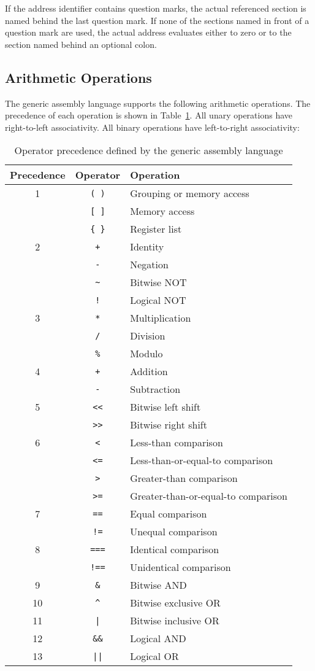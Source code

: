 If the address identifier contains question marks, the actual referenced section is named behind the last question mark.
If none of the sections named in front of a question mark are used, the actual address evaluates either to zero or to the section named behind an optional colon.

\subsection{Arithmetic Operations}

The generic assembly language supports the following arithmetic operations.
The precedence of each operation is shown in Table~\ref{tab:asmoperatorprecedence}.
All unary operations have right-to-left associativity.
All binary operations have left-to-right associativity:

\newcommand{\asmoperatorref}[2]{& \texttt{#1} & #2 \\}

\begin{table}
\centering
\begin{tabular}{@{}ccl@{}}
\toprule Precedence & Operator & Operation \\
\midrule 1
\asmoperatorref{( )}{Grouping or memory access}
\asmoperatorref{[ ]}{Memory access}
\asmoperatorref{\{ \}}{Register list}
\midrule 2
\asmoperatorref{+}{Identity}
\asmoperatorref{-}{Negation}
\asmoperatorref{\textasciitilde}{Bitwise NOT}
\asmoperatorref{!}{Logical NOT}
\midrule 3
\asmoperatorref{*}{Multiplication}
\asmoperatorref{/}{Division}
\asmoperatorref{\%}{Modulo}
\midrule 4
\asmoperatorref{+}{Addition}
\asmoperatorref{-}{Subtraction}
\midrule 5
\asmoperatorref{<{}<}{Bitwise left shift}
\asmoperatorref{>{}>}{Bitwise right shift}
\midrule 6
\asmoperatorref{<}{Less-than comparison}
\asmoperatorref{<=}{Less-than-or-equal-to comparison}
\asmoperatorref{>}{Greater-than comparison}
\asmoperatorref{>=}{Greater-than-or-equal-to comparison}
\midrule 7
\asmoperatorref{==}{Equal comparison}
\asmoperatorref{!=}{Unequal comparison}
\midrule 8
\asmoperatorref{===}{Identical comparison}
\asmoperatorref{!==}{Unidentical comparison}
\midrule 9
\asmoperatorref{\&}{Bitwise AND}
\midrule 10
\asmoperatorref{\^}{Bitwise exclusive OR}
\midrule 11
\asmoperatorref{|}{Bitwise inclusive OR}
\midrule 12
\asmoperatorref{\&\&}{Logical AND}
\midrule 13
\asmoperatorref{||}{Logical OR}
\bottomrule
\end{tabular}
\caption{Operator precedence defined by the generic assembly language}
\label{tab:asmoperatorprecedence}
\end{table}

